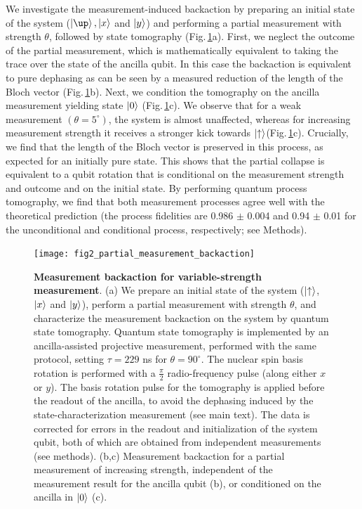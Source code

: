 We investigate the measurement-induced backaction by preparing an initial state of the system ($\ket{\up},\ket{x}$ and $\left|y\right>$) and performing a partial measurement with strength $\theta$, followed by state tomography (Fig.\,\ref{fig:amc-fig2}a). First, we neglect the outcome of the partial measurement, which is mathematically equivalent to taking the trace over the state of the ancilla qubit. In this case the backaction is equivalent to pure dephasing as can be seen by a measured reduction of the length of the Bloch vector (Fig.\,\ref{fig:amc-fig2}b). Next, we condition the tomography on the ancilla measurement yielding state $\left|0\right>$ (Fig.\,\ref{fig:amc-fig2}c). We observe that for a weak measurement $(\theta = 5^{\circ})$, the system is almost unaffected, whereas for increasing measurement strength it receives a stronger kick towards $\left|\uparrow\right> $(Fig.\,\ref{fig:amc-fig2}c). Crucially, we find that the length of the Bloch vector is preserved in this process, as expected for an initially pure state. This shows that the partial collapse is equivalent to a qubit rotation that is conditional on the measurement strength and outcome and on the initial state. By performing quantum process tomography, we find that both measurement processes agree well with the theoretical prediction (the process fidelities are 0.986 $\pm$ 0.004 and 0.94 $\pm$ 0.01 for the unconditional and conditional process, respectively; see Methods).


\begin{figure}
	\centering
	\texttt{[image: fig2\_partial\_measurement\_backaction]}
	\caption{\label{fig:amc-fig2} \textbf{Measurement backaction for variable-strength measurement}. (a) We prepare an initial state  of the system ($\left|\uparrow\right>$,  $\left|x\right>$ and  $\left|y\right>$), perform a partial measurement with strength $\theta$, and characterize the measurement backaction on the system by quantum state tomography. Quantum state tomography is implemented by an ancilla-assisted projective measurement, performed with the same protocol, setting $\tau = 229$ ns for $\theta = 90^{\circ}$. The nuclear spin basis rotation is performed with a $\frac{\pi}{2}$ radio-frequency pulse (along either $x$ or $y$). The basis rotation pulse for the tomography is applied before the readout of the ancilla, to avoid the dephasing induced by the state-characterization measurement (see main text). The data is corrected for errors in the readout and initialization of the system qubit, both of which are obtained from independent measurements (see methods). (b,c)  Measurement backaction for a partial measurement of increasing strength, independent of the measurement result for the ancilla qubit (b), or conditioned on the ancilla in  $\left|0\right>$ (c). }
\end{figure}

